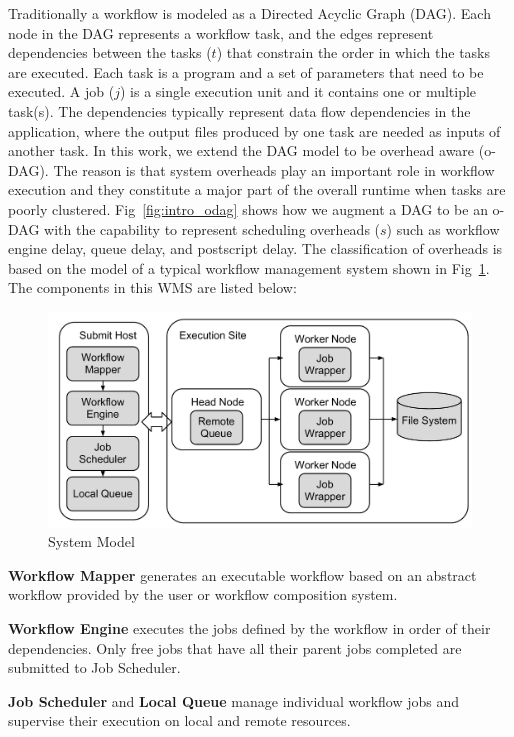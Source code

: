 Traditionally a workflow is modeled as a Directed Acyclic Graph (DAG). Each node in the DAG represents a workflow task, and the edges represent dependencies between the tasks ($t$) that constrain the order in which the tasks are executed. Each task is a program and a set of parameters that need to be executed. A job ($j$) is a single execution unit and it contains one or multiple task(s). The dependencies typically represent data flow dependencies in the application, where the output files produced by one task are needed as inputs of another task. In this work, we extend the DAG model to be overhead aware (o-DAG). The reason is that system overheads play an important role in workflow execution and they constitute a major part of the overall runtime when tasks are poorly clustered. Fig~\ref{fig:intro_odag} shows how we augment a DAG to be an o-DAG with the capability to represent scheduling overheads ($s$) such as workflow engine delay, queue delay, and postscript delay. The classification of overheads is based on the model of a typical workflow management system shown in Fig~\ref{fig:intro_system}. The components in this WMS are listed below: 

\begin{figure}[h!]
\centering
  \includegraphics[width=0.7\linewidth]{figures/introduction/model.pdf}

  \caption{System Model}
  \label{fig:intro_system}
\end{figure}


\textbf{Workflow Mapper} generates an executable workflow based on an abstract workflow provided by the user or workflow composition system. 

\textbf{Workflow Engine} executes the jobs defined by the workflow in order of their dependencies. Only free jobs that have all their parent jobs completed are submitted to  Job Scheduler. 

\textbf{Job Scheduler} and \textbf{Local Queue} manage individual workflow jobs and supervise their execution on local and remote resources.


